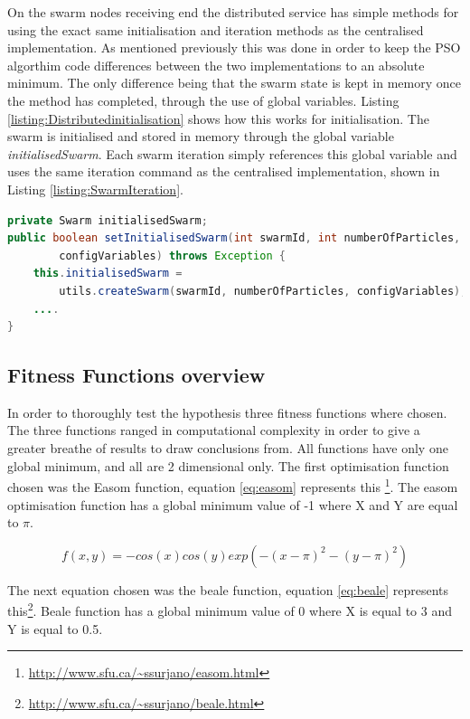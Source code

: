 \documentclass[oneside,12pt]{book}
\begin{document}
On the swarm nodes receiving end the distributed service has simple methods for using the exact same initialisation and iteration methods as the centralised implementation. As mentioned previously this was done in order to keep the PSO algorthim code differences between the two implementations to an absolute minimum. The only difference being that the swarm state is kept in memory once the method has completed, through the use of global variables. Listing \ref{listing:Distributedinitialisation} shows how this works for initialisation. The swarm is initialised and stored in memory through the global variable \textit{initialisedSwarm}. Each swarm iteration simply references this global variable and uses the same iteration command as the centralised implementation, shown in Listing \ref{listing:SwarmIteration}.

\begin{lstlisting}[basicstyle=\footnotesize, language=Java]
private Swarm initialisedSwarm;
public boolean setInitialisedSwarm(int swarmId, int numberOfParticles, ConfigVariables         
        configVariables) throws Exception {
    this.initialisedSwarm = 
        utils.createSwarm(swarmId, numberOfParticles, configVariables);
    ....
}
\end{lstlisting}
\label{listing:Distributedinitialisation}

\subsection{Fitness Functions overview}
In order to thoroughly test the hypothesis three fitness functions where chosen. The three functions ranged in computational complexity in order to give a greater breathe of results to draw conclusions from. All functions have only one global minimum, and all are 2 dimensional only. The first optimisation function chosen was the Easom function, equation \ref{eq:easom} represents this \footnote{\url{http://www.sfu.ca/~ssurjano/easom.html}}. The easom optimisation function has a global minimum value of -1 where X and Y are equal to $\pi$. 

\begin{equation}\label{eq:easom}
f(x,y) = −cos(x)cos(y) exp(−(x − \pi)^2−(y − \pi)^2)
\end{equation}

The next equation chosen was the beale function, equation \ref{eq:beale} represents this\footnote{\url{http://www.sfu.ca/~ssurjano/beale.html}}. Beale function has a global minimum value of 0 where X is equal to 3 and Y is equal to 0.5. 
\end{document}
